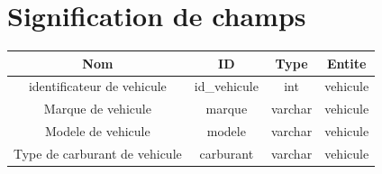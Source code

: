 \section{Signification de champs}
\begin{center}
\begin{table}[htp]

 \begin{tabular}{||c||  c||  c||  c||} 
 \hline
 Nom & ID & Type & Entite \\ [0.5ex] 
 \hline\hline
 identificateur de vehicule &  id\_vehicule & int & vehicule \\ 
 \hline
 Marque de vehicule & marque & varchar & vehicule \\
 \hline
 Modele de vehicule& modele & varchar & vehicule \\
 \hline
 
Type de carburant de vehicule& carburant & varchar & vehicule \\
 \hline
 

\end{tabular}
\end{table}
\end{center}
